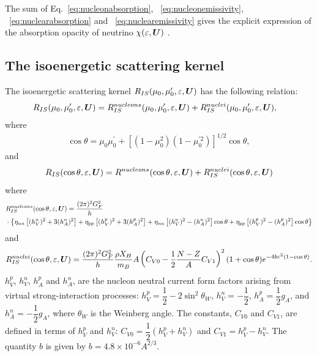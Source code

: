 \documentclass[10pt,preprint]{aastex}
\begin{document}
The sum of Eq.~\eqref{eq:nucleonabsorption}, ~\eqref{eq:nucleonemissivity}, ~\eqref{eq:nuclearabsorption} and ~\eqref{eq:nuclearemissivity} gives the explicit expression of the absorption opacity of neutrino $\chi(\varepsilon,\boldsymbol{U})$ .

\subsection{The isoenergetic scattering kernel}
The isoenergetic scattering kernel $R_{IS}(\mu_0, \mu^\prime_0, \varepsilon,\boldsymbol{U})$ has the following relation:
\begin{align}
R_{IS}(\mu_0, \mu^\prime_0, \varepsilon,\boldsymbol{U}) & = R_{IS}^{nucleons}(\mu_0, \mu^\prime_0, \varepsilon,\boldsymbol{U}) +  R_{IS}^{nuclei}(\mu_0, \mu^\prime_0, \varepsilon,\boldsymbol{U}),
\end{align}
where
\begin{align}
\cos\theta = \mu_0\mu^\prime_0 + [(1-\mu_0^2)(1-\mu_0^{\prime 2})]^{1/2}\cos\theta,
\end{align}
and
\begin{align}
R_{IS}(\cos\theta, \varepsilon, \boldsymbol{U}) = R^{nucleons}(\cos\theta,\varepsilon, \boldsymbol{U}) + R^{nuclei}_{IS}(\cos\theta, \varepsilon, \boldsymbol{U})
\end{align}
where
\begin{align}
& R^{nucleons}_{IS} (\cos\theta,\varepsilon, \boldsymbol{U}) = \dfrac{(2\pi)^2 G_F^2}{h} \nonumber \\
& \cdot \left\lbrace  \eta_{nn}\left[ (h^n_V)^2 + 3(h^n_A)^2\right] + \eta_{pp} \left[ (h^p_V)^2 + 3(h^p_A)^2\right] +\eta_{nn}\left[ (h^n_V)^2 - (h^n_A)^2\right]\cos\theta + \eta_{pp}\left[ (h^p_V)^2 - (h^p_A)^2\right]\cos\theta \right\rbrace 
\end{align}
and
\begin{align}
R^{nuclei}_{IS}(\cos\theta,\varepsilon,\boldsymbol{U})  = \dfrac{(2\pi)^2 G_F^2}{h}\dfrac{\rho X_H}{m_B}A\left(  C_{V0} - \dfrac{1}{2}\dfrac{N-Z}{A} C_{V1}\right)^2(1+\cos\theta)e^{-4b\varepsilon^2(1-\cos\theta)}.
\end{align}
$h^p_V$, $h^n_V$, $h^p_A$ and $h^n_A$, are the nucleon neutral current form factors arising from virtual strong-interaction processes: $h_V^p = \dfrac{1}{2} - 2 \sin^2\theta_W$, $h^n_V = - \dfrac{1}{2}$, $h_A^p = \dfrac{1}{2}g_A$, and $h^n_A = - \dfrac{1}{2} g_A$, where $\theta_W$ is the Weinberg angle. The constants, $C_{V0}$ and $C_{V1}$, are defined in terms of $h_V^p$ and $h_V^n$: $C_{V0} = \dfrac{1}{2}(h_V^p + h_V^n)$ and $C_{V1} = h_V^p - h_V^n$. The quantity $b$ is given by $b = 4.8 \times 10^{-6} A^{2/3}$. 
\end{document}
